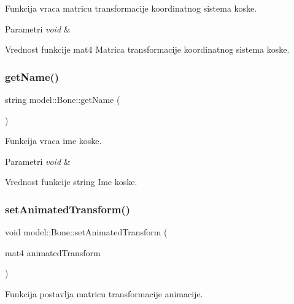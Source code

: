 Funkcija vraca matricu transformacije koordinatnog sistema koske. 


\begin{DoxyParams}{Parametri}
{\em void} & \\
\hline
\end{DoxyParams}
\begin{DoxyReturn}{Vrednost funkcije}
mat4 Matrica transformacije koordinatnog sistema koske. 
\end{DoxyReturn}
\mbox{\label{classmodel_1_1Bone_ae8a8cffeae8879f3c2d572c55c8bbdbb}} 
\subsubsection{\texorpdfstring{get\+Name()}{getName()}}
{\footnotesize\ttfamily string model\+::\+Bone\+::get\+Name (\begin{DoxyParamCaption}{ }\end{DoxyParamCaption})}



Funkcija vraca ime koske. 


\begin{DoxyParams}{Parametri}
{\em void} & \\
\hline
\end{DoxyParams}
\begin{DoxyReturn}{Vrednost funkcije}
string Ime koske. 
\end{DoxyReturn}
\mbox{\label{classmodel_1_1Bone_afe6c5180dae41b82ffcaaf8e0fbb756d}} 
\subsubsection{\texorpdfstring{set\+Animated\+Transform()}{setAnimatedTransform()}}
{\footnotesize\ttfamily void model\+::\+Bone\+::set\+Animated\+Transform (\begin{DoxyParamCaption}\item[{mat4}]{animated\+Transform }\end{DoxyParamCaption})}



Funkcija postavlja matricu transformacije animacije. 


